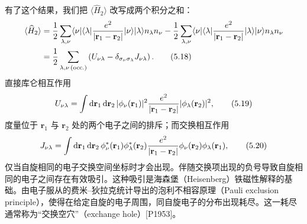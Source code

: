 有了这个结果，我们把 $\langle\widehat{H}_2\rangle$ 改写成两个积分之和：
\begin{align*}
\langle\widehat{H}_2\rangle&=\frac{1}{2}\sum_{\lambda,\nu}\langle\nu|\langle\lambda|\frac{e^2}{|\mathbf{r}_1-\mathbf{r}_2|}|\nu\rangle|\lambda\rangle n_\lambda n_\nu-\frac{1}{2}\sum_{\lambda,\nu}\langle\nu|\langle\lambda|\frac{e^2}{|\mathbf{r}_1-\mathbf{r}_2|}|\lambda\rangle|\nu\rangle n_\lambda n_\nu\\
&=\frac{1}{2}\sum_{\lambda,\nu\,{\rm (occ.)}}\left(U_{\nu\lambda}-\delta_{\sigma_\nu\sigma_\lambda}J_{\nu\lambda}\right).
\tag{5.18}
\end{align*}
直接库仑相互作用
\begin{equation*}
U_{\nu\lambda}=\int{\rm d}\mathbf{r}_1\,{\rm d}\mathbf{r}_2\,|\phi_\nu(\mathbf{r}_1)|^2\frac{e^2}{|\mathbf{r}_1-\mathbf{r}_2|}|\phi_\lambda(\mathbf{r}_2)|^2,
\tag{5.19}
\end{equation*}
度量位于 $\mathbf{r}_1$ 与 $\mathbf{r}_2$ 处的两个电子之间的排斥；而交换相互作用
\begin{equation*}
J_{\nu\lambda}=\int{\rm d}\mathbf{r}_1\,{\rm d}\mathbf{r}_2\,\phi_\nu^*(\mathbf{r}_1)\phi_\lambda^*(\mathbf{r}_2)\frac{e^2}{|\mathbf{r}_1-\mathbf{r}_2|}\phi_\nu(\mathbf{r}_2)\phi_\lambda(\mathbf{r}_1),
\tag{5.20}
\end{equation*}
仅当自旋相同的电子交换空间坐标时才会出现。伴随交换项出现的负号导致自旋相同的电子之间存在有效吸引。这种吸引是海森堡（Heisenberg）铁磁性解释的基础。由电子服从的费米–狄拉克统计导出的泡利不相容原理（Pauli exclusion principle），使得在给定自旋的电子周围，同自旋电子的分布出现耗尽。这一耗尽通常称为“交换空穴”（exchange hole）[P1953]。

